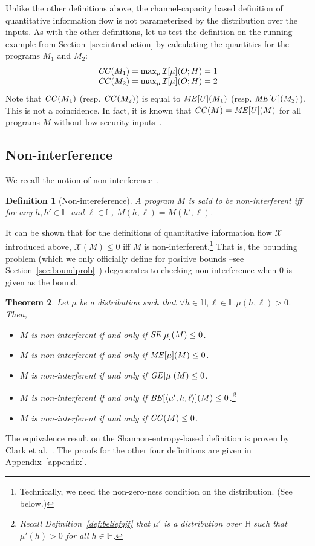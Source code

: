 \documentclass{llncs}
\newtheorem{theorem}{Theorem}[section]
\newtheorem{definition}[theorem]{Definition}
\newcommand{\aseq}[1]{\langle#1\rangle}
\begin{document}
Unlike the other definitions above, the channel-capacity based
definition of quantitative information flow is not parameterized by
the distribution over the inputs.  As with the other definitions, let
us test the definition on the running example from
Section~\ref{sec:introduction} by calculating the quantities for the
programs $M_1$ and $M_2$:
\[
\begin{array}{l}
{\it CC}(M_1)=\max_\mu\mathcal{I}[\mu](O;H) =1 \\
{\it CC}(M_2)=\max_\mu\mathcal{I}[\mu](O;H) =2
\end{array}
\]
Note that ${\it CC}(M_1)$ (resp. ${\it CC}(M_2)$) is equal to ${\it
ME}[U](M_1)$ (resp. ${\it ME}[U](M_2)$).  This is not a coincidence.
In fact, it is known that ${\it CC}(M) = {\it ME}[U](M)$ for all
programs $M$ without low security inputs~\cite{smith09}.

\subsection{Non-interference}

\label{sec:nonint}

We recall the notion of
non-interference~\cite{DBLP:conf/sosp/Cohen77,goguen:sp1982}.
\begin{definition}[Non-intereference]
A program $M$ is said to be non-interferent iff for any $h,h'\in
\mathbb{H}$ and $\ell\in\mathbb{L}$, $M(h,\ell)=M(h',\ell)$.
\end{definition}

It can be shown that for the definitions of quantitative information
flow $\mathcal{X}$ introduced above, $\mathcal{X}(M) \leq 0$ iff $M$
is non-interferent.\footnote{Technically, we need the non-zero-ness
  condition on the distribution.  (See below.)}  That is, the bounding
problem (which we only officially define for positive bounds --see
Section~\ref{sec:boundprob}--) degenerates to checking
non-interference when $0$ is given as the bound.

\begin{theorem}
\label{thm:nonint}
Let $\mu$ be a distribution such that $\forall
h\in\mathbb{H},\ell\in\mathbb{L}.\mu(h,\ell)>0$.  Then,
\begin{itemize}
\item $M$ is non-interferent if and only if ${\it SE}[\mu](M) \leq 0$.
\item $M$ is non-interferent if and only if ${\it ME}[\mu](M) \leq 0$.
\item $M$ is non-interferent if and only if ${\it GE}[\mu](M) \leq 0$.
\item $M$ is non-interferent if and only if ${\it BE}[\aseq{\mu',h,\ell}](M)\le 0$.\footnote{Recall Definition~\ref{def:beliefqif} that $\mu'$ is a distribution over $\mathbb{H}$ such that $\mu'(h) > 0$ for all $h \in \mathbb{H}$.}
\item $M$ is non-interferent if and only if ${\it CC}(M) \leq 0$.
\end{itemize}
\end{theorem}
The equivalence result on the Shannon-entropy-based definition is
proven by Clark et al.~\cite{clark05}.  The proofs for the other four
definitions are given in Appendix~\ref{appendix}.
\end{document}
